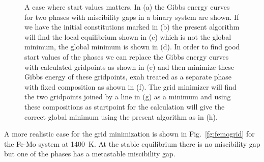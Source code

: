 \documentclass[12pt]{article}
\begin{document}
\begin{figure}[!h]
\begin{center}
\end{center}
\caption{A case where start values matters.  In (a) the Gibbs energy
curves for two phases with miscibility gaps in a binary system are
shown.  If we have the initial constitutions marked in (b) the present
algorithm will find the local equilibrium shown in (c) which is not
the global minimum, the global minimum is shown in (d).  In order to
find good start values of the phases we can replace the Gibbs energy
curves with calculated gridpoints as shown in (e) and then minimize
these Gibbs energy of these gridpoints, exah treated as a separate
phase with fixed composition as shown in (f).  The grid minimizer will
find the two gridpoints joined by a line in (g) as a minimum and using
these compositions as startpoint for the calculation will give the
correct global minimum using the present algorithm as in
(h).}\label{fg:grid1}
\end{figure}

A more realistic case for the grid minimization is shown in
Fig.~\ref{fg:femogrid} for the Fe-Mo system at 1400~K.  At the stable
equilibrium there is no miscibility gap but one of the phases has a
metastable miscibility gap.
\end{document}
